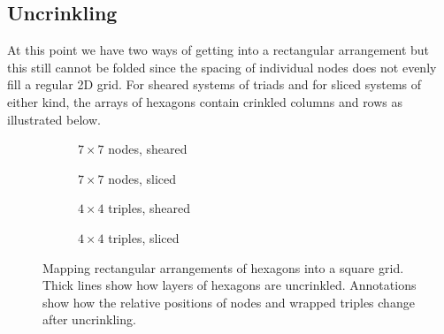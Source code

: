 		\subsection{Uncrinkling}
			
			At this point we have two ways of getting into a rectangular arrangement
			but this still cannot be folded since the spacing of individual nodes
			does not evenly fill a regular 2D grid. For sheared systems of triads and
			for sliced systems of either kind, the arrays of hexagons contain
			crinkled columns and rows as illustrated below.
			
			\begin{figure}
				\center
				\begin{subfigure}[b]{0.44\linewidth}
					\center
					
					\caption{$7 \times 7$ nodes, sheared}
					\label{fig:uncrinkling-node-sheared}
				\end{subfigure}
				\begin{subfigure}[b]{0.44\linewidth}
					\center
					
					\caption{$7 \times 7$ nodes, sliced}
					\label{fig:uncrinkling-node-sliced}
				\end{subfigure}
				
				\vspace{1cm}
				
				\begin{subfigure}[b]{0.44\linewidth}
					\center
					
					\caption{$4 \times 4$ triples, sheared}
					\label{fig:uncrinkling-sheared}
				\end{subfigure}
				\begin{subfigure}[b]{0.44\linewidth}
					\center
					
					\caption{$4 \times 4$ triples, sliced}
					\label{fig:uncrinkling-sliced}
				\end{subfigure}
				
				\vspace{1em}
				
				\caption{Mapping rectangular arrangements of hexagons into a square
				grid. Thick lines show how layers of hexagons are uncrinkled.
				Annotations show how the relative positions of nodes and wrapped triples
				change after uncrinkling.}
				\label{fig:uncrinkling}
			\end{figure}
			

